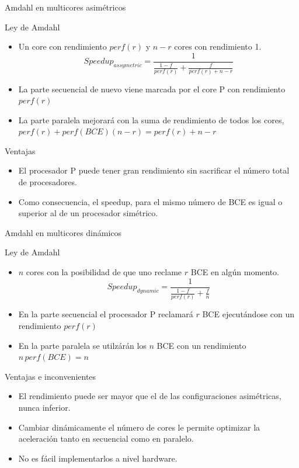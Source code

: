 \documentclass[utf8]{beamer}
\begin{document}
\begin{frame}[allowframebreaks]{Amdahl en multicores asimétricos}
    \begin{block}{Ley de Amdahl}
        \begin{itemize} 
            \item Un core con rendimiento $perf(r)$ y $n - r$ cores con rendimiento 1.
            $$ Speedup_{assymetric} = \frac{1}{\frac{1 - f}{perf(r)} + \frac{f}{perf(r) + n - r}} $$
            \item La parte secuencial de nuevo viene marcada por el core P con rendimiento $perf(r)$
            \item La parte paralela mejorará con la suma de rendimiento de todos los cores, $perf(r) + perf(BCE) (n - r) = perf(r) + n - r$
        \end{itemize}
    \end{block}
    \begin{block}{Ventajas}
        \begin{itemize}
            \item El procesador P puede tener gran rendimiento sin sacrificar el número total de procesadores.
            \item Como consecuencia, el speedup, para el mismo número de BCE es igual o superior al de un procesador simétrico.
        \end{itemize}
    \end{block}
\end{frame}

\begin{frame}[allowframebreaks]{Amdahl en multicores dinámicos}
    \begin{block}{Ley de Amdahl}
        \begin{itemize}
            \item $n$ cores con la posibilidad de que uno reclame $r$ BCE en algún momento.
            $$ Speedup_{dynamic} = \frac{1}{\frac{1 - f}{perf(r)} + \frac{f}{n}} $$
            \item En la parte secuencial el procesador P reclamará $r$ BCE ejecutándose con un rendimiento $perf(r)$
            \item En la parte paralela se utilzárán los $n$ BCE con un rendimiento $n\,perf(BCE) = n$
        \end{itemize}
    \end{block}
    \begin{block}{Ventajas e inconvenientes}
        \begin{itemize}
            \item El rendimiento puede ser mayor que el de las configuraciones asimétricas, nunca inferior.
            \item Cambiar dinámicamente el número de cores le permite optimizar la aceleración tanto en secuencial como en paralelo. 
            \item No es fácil implementarlos a nivel hardware.
        \end{itemize}
    \end{block}
\end{frame}
\end{document}
